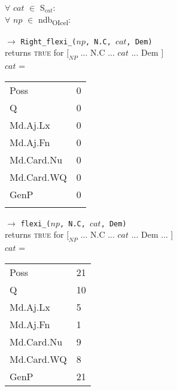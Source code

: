 \documentclass[output=paper,colorlinks,citecolor=brown,draft]{langscibook}
\begin{document}
\begin{exe}
   \ex \label{SMDem1}  $\forall$ $cat$ $\in$  S$_{cat}$: \\   
   \indent \hspace{5mm}$\forall$ $np$ $\in$  ndb\textsubscript{OIcel}:  
   
   \begin{xlist}\small 
      \ex \label{AlFlex} $\rightarrow$  \texttt{Right\_flexi\_($np$, N.C, $cat$,  Dem)}   \\ \indent \hfill returns \textsc{true} for $[_{NP}$  ... N.C  ... $cat$ ... Dem $]$  \\ 

$cat$ = 
\begin{tabular}{l l }
\midrule	Poss 			&	0 \\
	Q 			&	0 \\
	Md.Aj.Lx 		&	0 \\
	Md.Aj.Fn		& 	0   \\
	Md.Card.Nu  	& 	0     \\
	Md.Card.WQ  	& 	0  \\
	GenP 		 	&	0  \\
\midrule \\
\end{tabular} 

    \ex \label{NFlex} $\rightarrow$   \texttt{flexi\_($np$, N.C,  $cat$, Dem)} \\ 
    \indent \hfill returns \textsc{true} for $[_{NP}$ ... N.C  ... $cat$ ...  Dem ...  $]$ \\ 

$cat$ = 
\begin{tabular}{l l }
\midrule	Poss 			&	21 \\
	Q 			&	10 \\
	Md.Aj.Lx 		&	5 \\
	Md.Aj.Fn		& 	1   \\
	Md.Card.Nu  	& 	9     \\
	Md.Card.WQ  	& 	8  \\
	GenP 		 	&	21  \\
\midrule
\end{tabular}  
   \end{xlist}
\end{exe}
\end{document}
